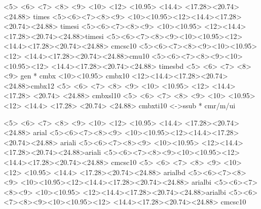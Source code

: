 \def\fileversion{v2.2f}
\def\filedate{1994/06/21}

   {  <5> <6> <7> <8> <9> <10> <12> 
      <10.95> 
      <14.4>  
      <17.28><20.74><24.88> times}{}
    {
      <5><6><7><8><9>
      <10><10.95><12><14.4><17.28><20.74><24.88> timesi%
      }{}
    {
      <5><6><7><8><9>
      <10><10.95>
      <12><14.4><17.28><20.74><24.88>timesi%
      }{}
    {
      <5><6><7><8><9><10><10.95><12>
      <14.4><17.28><20.74><24.88> cmcsc10
      }{}
%
   {
      <5><6><7><8><9><10><10.95><12>%
      <14.4><17.28><20.74><24.88>cmu10%
      }{}
     {
      <5><6><7><8><9><10><10.95><12>
      <14.4><17.28><20.74><24.88> timesbd}{}
   {
      <5> <6> <7> <8> <9> gen * cmbx
      <10><10.95> cmbx10
      <12><14.4><17.28><20.74><24.88>cmbx12
      }{}
      {
      <5> <6> <7> <8> <9>
      <10> <10.95> <12> <14.4> <17.28> <20.74> <24.88> cmbxsl10
      }{}
      {
      <5> <6>  <7>  <8> <9>
      <10> <10.95> <12> <14.4> <17.28> <20.74> <24.88> cmbxti10
      }{}
%
      {<->ssub * cmr/m/ui}{}





   {  <5> <6> <7> <8> <9> <10> <12> 
      <10.95> 
      <14.4>  
      <17.28><20.74><24.88> arial}{}
    {
      <5><6><7><8><9>
      <10><10.95><12><14.4><17.28><20.74><24.88> ariali%
      }{}
    {
      <5><6><7><8><9>
      <10><10.95>
      <12><14.4><17.28><20.74><24.88>ariali%
      }{}
    {
      <5><6><7><8><9><10><10.95><12>
      <14.4><17.28><20.74><24.88> cmcsc10
      }{}
   {  <5> <6> <7> <8> <9> <10> <12> 
      <10.95> 
      <14.4>  
      <17.28><20.74><24.88> arialbd}{}
    {
      <5><6><7><8><9>
      <10><10.95><12><14.4><17.28><20.74><24.88> arialbi%
      }{}
    {
      <5><6><7><8><9>
      <10><10.95>
      <12><14.4><17.28><20.74><24.88>arialbi%
      }{}
    {
      <5><6><7><8><9><10><10.95><12>
      <14.4><17.28><20.74><24.88> cmcsc10
      }{}



